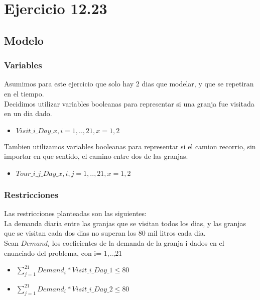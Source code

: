 \section{Ejercicio 12.23}

\subsection{Modelo}

\subsubsection{Variables}


Asumimos para este ejercicio que solo hay 2 dias que modelar, y que se repetiran en el tiempo. \\

Decidimos utilizar variables booleanas para representar si una granja fue visitada en un dia dado. \\

\begin{itemize}
\item $Visit\_i\_Day\_x,  i = 1, .. ,21, x = 1,2$ \\
\end{itemize}

Tambien utilizamos variables booleanas para representar si el camion recorrio, sin importar en que sentido, el camino entre dos de las granjas. \\

\begin{itemize}
\item $Tour\_i\_j\_Day\_x,  i,j = 1, .. ,21, x = 1,2 $ \\
\end{itemize}

\subsubsection{Restricciones}

Las restricciones planteadas son las siguientes: \\

La demanda diaria entre las granjas que se visitan todos los dias, y las granjas que se visitan cada dos dias no superan los 80 mil litros cada dia.\\
Sean $Demand_i$ los coeficientes de la demanda de la granja i dados en el enunciado del problema, con i= 1,..,21 \\

\begin{itemize}
\item $\sum_{j=1}^{21} Demand_i * Visit\_i\_Day\_1 \leq 80$ \\
\item $\sum_{j=1}^{21} Demand_i * Visit\_i\_Day\_2 \leq 80$ \\
\end{itemize}


